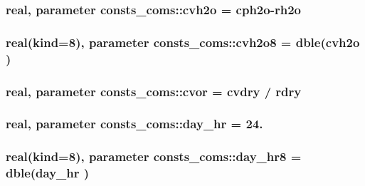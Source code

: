 \subsubsection[{\texorpdfstring{cvh2o}{cvh2o}}]{\setlength{\rightskip}{0pt plus 5cm}real, parameter consts\+\_\+coms\+::cvh2o = {\bf cph2o}-\/{\bf rh2o}}\hypertarget{namespaceconsts__coms_ab682f9c81b6c22b86609a07c45d0d169}{}\label{namespaceconsts__coms_ab682f9c81b6c22b86609a07c45d0d169}
\subsubsection[{\texorpdfstring{cvh2o8}{cvh2o8}}]{\setlength{\rightskip}{0pt plus 5cm}real(kind=8), parameter consts\+\_\+coms\+::cvh2o8 = dble({\bf cvh2o} )}\hypertarget{namespaceconsts__coms_a164ea9d19363574220b5b326c8c7555f}{}\label{namespaceconsts__coms_a164ea9d19363574220b5b326c8c7555f}
\subsubsection[{\texorpdfstring{cvor}{cvor}}]{\setlength{\rightskip}{0pt plus 5cm}real, parameter consts\+\_\+coms\+::cvor = {\bf cvdry} / {\bf rdry}}\hypertarget{namespaceconsts__coms_a0460927d177fee178c656807e4611487}{}\label{namespaceconsts__coms_a0460927d177fee178c656807e4611487}
\subsubsection[{\texorpdfstring{day\+\_\+hr}{day_hr}}]{\setlength{\rightskip}{0pt plus 5cm}real, parameter consts\+\_\+coms\+::day\+\_\+hr = 24.}\hypertarget{namespaceconsts__coms_a9cac2538090fb8cf04aaeaf9b1f92466}{}\label{namespaceconsts__coms_a9cac2538090fb8cf04aaeaf9b1f92466}
\subsubsection[{\texorpdfstring{day\+\_\+hr8}{day_hr8}}]{\setlength{\rightskip}{0pt plus 5cm}real(kind=8), parameter consts\+\_\+coms\+::day\+\_\+hr8 = dble({\bf day\+\_\+hr} )}\hypertarget{namespaceconsts__coms_aa5f4f318d77a39b4f036f10c9d640211}{}\label{namespaceconsts__coms_aa5f4f318d77a39b4f036f10c9d640211}
